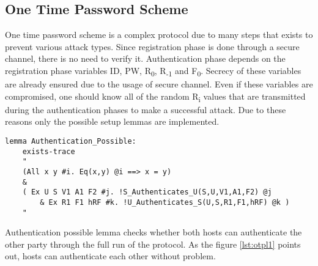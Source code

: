 \documentclass[a4paper, 12pt, titlepage]{article}
\begin{document}
\subsection{One Time Password Scheme}
One time password scheme is a complex protocol due to many steps that exists to prevent various attack types. Since registration phase is done through a secure channel, there is no need to verify it. Authentication phase depends on the registration phase variables ID, PW, R\textsubscript{0}, R\textsubscript{-1} and F\textsubscript{0}. Secrecy of these variables are already ensured due to the usage of secure channel. Even if these variables are compromised, one should know all of the random R\textsubscript{i} values that are transmitted during the authentication phases to make a successful attack. Due to these reasons only the possible setup lemmas are implemented.
\begin{lstlisting}[caption = Implementation of authentication possible lemma of One Time Password Scheme, label={lst:otpl1}]
lemma Authentication_Possible:
	exists-trace
	"
	(All x y #i. Eq(x,y) @i ==> x = y)
	&
	( Ex U S V1 A1 F2 #j. !S_Authenticates_U(S,U,V1,A1,F2) @j
		& Ex R1 F1 hRF #k. !U_Authenticates_S(U,S,R1,F1,hRF) @k )
	"
\end{lstlisting}
Authentication possible lemma checks whether both hosts can authenticate the other party through the full run of the protocol. As the figure \ref{lst:otpl1} points out, hosts can authenticate each other without problem.
\end{document}
